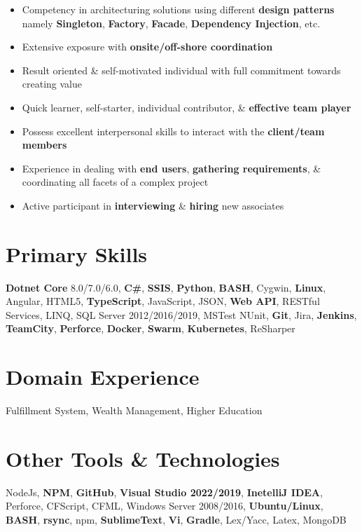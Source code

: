 \documentclass[letterpaper,11pt]{article}
\begin{document}
\begin{itemize}
    \item Competency in architecturing solutions using different \textbf{\color{darkgray}design patterns} namely \textbf{\color{darkgray}Singleton}, \textbf{\color{darkgray}Factory}, \textbf{\color{darkgray}Facade}, \textbf{\color{darkgray}Dependency Injection}, etc.
    \item Extensive exposure with \textbf{\color{darkgray}onsite/off-shore coordination}
    \item Result oriented \& self-motivated individual with full commitment towards creating value
    \item Quick learner, self-starter, individual contributor, \& \textbf{\color{darkgray}effective team player}
    \item Possess excellent interpersonal skills to interact with the \textbf{\color{darkgray}client/team members}
    \item Experience in dealing with \textbf{\color{darkgray}end users}, \textbf{\color{darkgray}gathering requirements}, \& coordinating all facets of a complex project
    \item Active participant in \textbf{\color{darkgray}interviewing} \& \textbf{\color{darkgray}hiring} new associates
\end{itemize}
\pagebreak

\section{Primary Skills}
\textbf{\color{darkgray}Dotnet Core} 8.0/7.0/6.0, \textbf{\color{darkgray}C\#}, \textbf{\color{darkgray}SSIS}, \textbf{\color{darkgray}Python}, \textbf{\color{darkgray}BASH}, Cygwin, \textbf{\color{darkgray}Linux}, Angular, HTML5, \textbf{\color{darkgray}TypeScript}, JavaScript, JSON, \textbf{\color{darkgray}Web API}, RESTful Services, LINQ, SQL Server 2012/2016/2019, MSTest NUnit, \textbf{\color{darkgray}Git}, Jira, \textbf{\color{darkgray}Jenkins}, \textbf{\color{darkgray}TeamCity}, \textbf{\color{darkgray}Perforce}, \textbf{\color{darkgray}Docker}, \textbf{\color{darkgray}Swarm}, \textbf{\color{darkgray}Kubernetes}, ReSharper

\section{Domain Experience}
Fulfillment System, Wealth Management, Higher Education

\section{Other Tools \& Technologies}
NodeJs, \textbf{\color{darkgray}NPM}, \textbf{\color{darkgray}GitHub}, \textbf{\color{darkgray}Visual Studio 2022/2019}, \textbf{\color{darkgray}InetelliJ IDEA}, Perforce, CFScript, CFML, Windows Server 2008/2016, \textbf{\color{darkgray}Ubuntu/Linux}, \textbf{\color{darkgray}BASH}, \textbf{\color{darkgray}rsync}, npm, \textbf{\color{darkgray}SublimeText}, \textbf{\color{darkgray}Vi}, \textbf{\color{darkgray}Gradle}, Lex/Yacc, Latex, MongoDB
\end{document}
